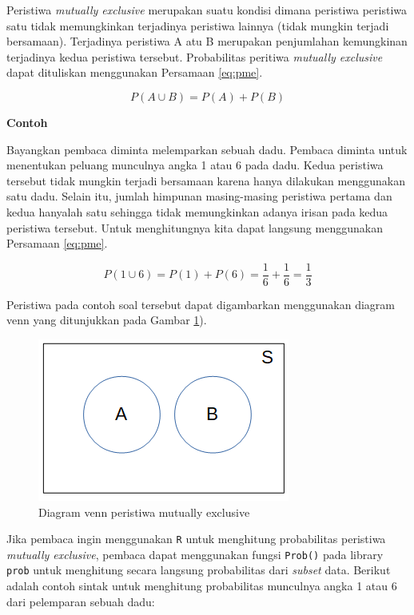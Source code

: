 \documentclass[]{book}
\begin{document}
Peristiwa \emph{mutually exclusive} merupakan suatu kondisi dimana
peristiwa peristiwa satu tidak memungkinkan terjadinya peristiwa lainnya
(tidak mungkin terjadi bersamaan). Terjadinya peristiwa A atu B
merupakan penjumlahan kemungkinan terjadinya kedua peristiwa tersebut.
Probabilitas peritiwa \emph{mutually exclusive} dapat dituliskan
menggunakan Persamaan \eqref{eq:pme}.

\begin{equation}
   P\left(A\cup B\right)=P\left(A\right)+P\left(B\right)
  \label{eq:pme}
\end{equation}

\textbf{Contoh}

Bayangkan pembaca diminta melemparkan sebuah dadu. Pembaca diminta untuk
menentukan peluang munculnya angka 1 atau 6 pada dadu. Kedua peristiwa
tersebut tidak mungkin terjadi bersamaan karena hanya dilakukan
menggunakan satu dadu. Selain itu, jumlah himpunan masing-masing
peristiwa pertama dan kedua hanyalah satu sehingga tidak memungkinkan
adanya irisan pada kedua peristiwa tersebut. Untuk menghitungnya kita
dapat langsung menggunakan Persamaan \eqref{eq:pme}.

\[
P\left(1\cup 6\right)=P\left(1\right)+P\left(6\right)=\frac{1}{6}+\frac{1}{6}=\frac{1}{3}
\]

Peristiwa pada contoh soal tersebut dapat digambarkan menggunakan
diagram venn yang ditunjukkan pada Gambar \ref{fig:pmevis}).

\begin{figure}

{\centering \includegraphics[width=0.8\linewidth]{pmevis} 

}

\caption{Diagram venn peristiwa mutually exclusive}\label{fig:pmevis}
\end{figure}

Jika pembaca ingin menggunakan \texttt{R} untuk menghitung probabilitas
peristiwa \emph{mutually exclusive}, pembaca dapat menggunakan fungsi
\texttt{Prob()} pada library \texttt{prob} untuk menghitung secara
langsung probabilitas dari \emph{subset} data. Berikut adalah contoh
sintak untuk menghitung probabilitas munculnya angka 1 atau 6 dari
pelemparan sebuah dadu:
\end{document}
